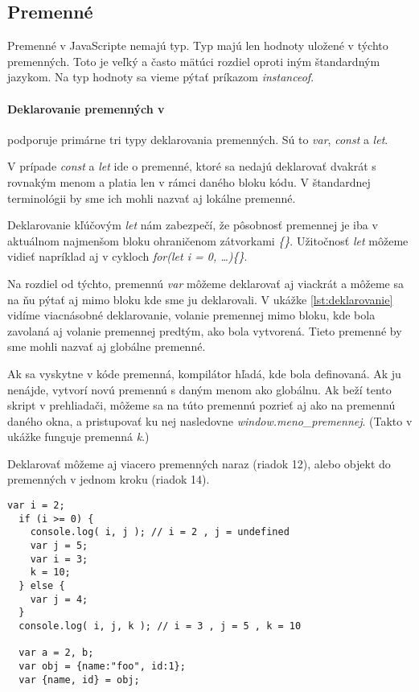 \subsection{Premenné}
Premenné v JavaScripte nemajú typ.  Typ majú len hodnoty uložené v týchto premenných. Toto je veľký a často mätúci rozdiel oproti iným štandardným jazykom. Na typ hodnoty sa vieme pýtať príkazom \emph{instanceof}.

\paragraph{Deklarovanie premenných v \JS{}}
\JS{} podporuje primárne tri typy deklarovania premenných. Sú to \emph{var}, \emph{const} a \emph{let}. 

V prípade \emph{const} a \emph{let} ide o premenné, ktoré sa nedajú deklarovať dvakrát s rovnakým menom a platia len v rámci daného bloku kódu. V štandardnej terminológii by sme ich mohli nazvať aj lokálne premenné. 

Deklarovanie kľúčovým \emph{let} nám zabezpečí, že pôsobnosť premennej je iba v aktuálnom najmenšom bloku ohraničenom zátvorkami \emph{\{\}}. Užitočnosť \emph{let} môžeme vidieť napríklad aj v cykloch \emph{for(let i = 0, \ldots)\{\}}.

Na rozdiel od týchto, premennú \emph{var} môžeme deklarovať aj viackrát a môžeme sa na ňu pýtať aj mimo bloku kde sme ju deklarovali. V ukážke \ref{lst:deklarovanie} vidíme viacnásobné deklarovanie, volanie premennej mimo bloku, kde bola zavolaná aj volanie premennej predtým, ako bola vytvorená. Tieto premenné by sme mohli nazvať aj globálne premenné. 

Ak sa vyskytne v kóde premenná, kompilátor hľadá, kde bola definovaná. Ak ju nenájde, vytvorí novú premennú s daným menom ako globálnu. Ak beží tento skript v prehliadači, môžeme sa na túto premennú pozrieť aj ako na premennú daného okna, a pristupovať ku nej nasledovne \emph{window.meno\_premennej}. (Takto v ukážke funguje premenná \emph{k}.)

Deklarovať môžeme aj viacero premenných naraz (riadok 12), alebo  objekt do premenných v jednom kroku (riadok 14).

\begin{lstlisting}[caption=JavaScript deklarovanie, label={lst:deklarovanie}]
  var i = 2;
  if (i >= 0) {
    console.log( i, j ); // i = 2 , j = undefined
    var j = 5;
    var i = 3;
    k = 10;
  } else {
    var j = 4;
  }
  console.log( i, j, k ); // i = 3 , j = 5 , k = 10

  var a = 2, b;
  var obj = {name:"foo", id:1};
  var {name, id} = obj;
\end{lstlisting}

